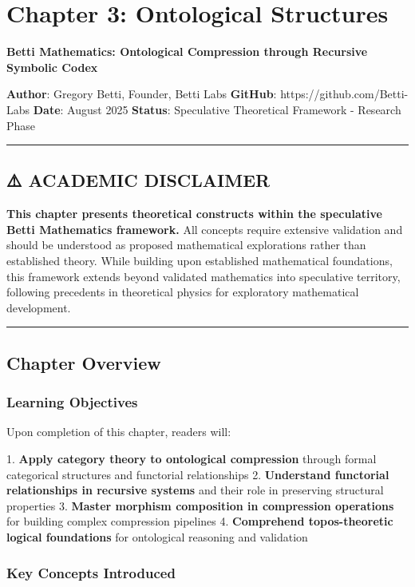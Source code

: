 \chapter{Chapter 3: Ontological Structures}

\textbf{Betti Mathematics: Ontological Compression through Recursive Symbolic Codex}

\textbf{Author}: Gregory Betti, Founder, Betti Labs  
\textbf{GitHub}: https://github.com/Betti-Labs  
\textbf{Date}: August 2025  
\textbf{Status}: Speculative Theoretical Framework - Research Phase

\hrule

\section{⚠️ ACADEMIC DISCLAIMER}

\textbf{This chapter presents theoretical constructs within the speculative Betti Mathematics framework.} All concepts require extensive validation and should be understood as proposed mathematical explorations rather than established theory. While building upon established mathematical foundations, this framework extends beyond validated mathematics into speculative territory, following precedents in theoretical physics for exploratory mathematical development.

\hrule

\section{Chapter Overview}

\subsection{Learning Objectives}

Upon completion of this chapter, readers will:

1. \textbf{Apply category theory to ontological compression} through formal categorical structures and functorial relationships
2. \textbf{Understand functorial relationships in recursive systems} and their role in preserving structural properties
3. \textbf{Master morphism composition in compression operations} for building complex compression pipelines
4. \textbf{Comprehend topos-theoretic logical foundations} for ontological reasoning and validation

\subsection{Key Concepts Introduced}

